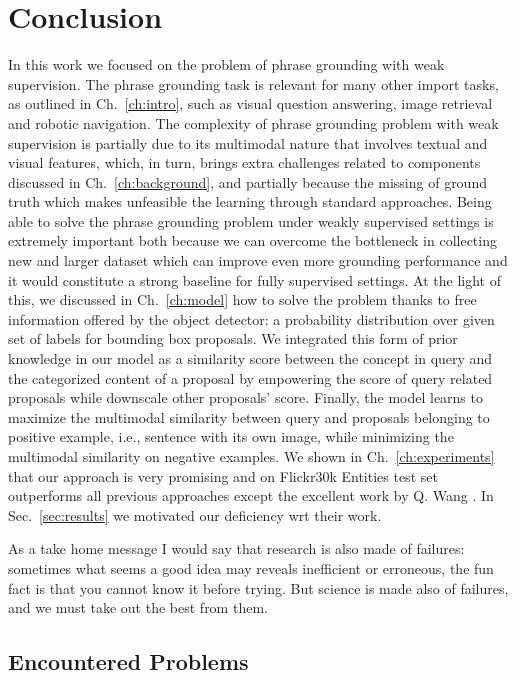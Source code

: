 \chapter{Conclusion}
\label{ch:conclusion}

In this work we focused on the problem of phrase grounding with weak
supervision. The phrase grounding task is relevant for many other
import tasks, as outlined in Ch.~\ref{ch:intro}, such as visual
question answering, image retrieval and robotic navigation. The
complexity of phrase grounding problem with weak supervision is
partially due to its multimodal nature that involves textual and
visual features, which, in turn, brings extra challenges related to
components discussed in Ch.~\ref{ch:background}, and partially because
the missing of ground truth which makes unfeasible the learning
through standard approaches. Being able to solve the phrase grounding
problem under weakly supervised settings is extremely important both
because we can overcome the bottleneck in collecting new and larger
dataset which can improve even more grounding performance and it would
constitute a strong baseline for fully supervised settings. At the
light of this, we discussed in Ch.~\ref{ch:model} how to solve the
problem thanks to free information offered by the object detector: a
probability distribution over given set of labels for bounding box
proposals. We integrated this form of prior knowledge in our model as
a similarity score between the concept in query and the categorized
content of a proposal by empowering the score of query related
proposals while downscale other proposals' score. Finally, the model
learns to maximize the multimodal similarity between query and
proposals belonging to positive example, i.e., sentence with its own
image, while minimizing the multimodal similarity on negative
examples. We shown in Ch.~\ref{ch:experiments} that our approach is
very promising and on Flickr30k Entities test set outperforms all
previous approaches except the excellent work by Q. Wang \etal{}
\cite{wang2020maf}. In Sec.~\ref{sec:results} we motivated our
deficiency wrt their work.

As a take home message I would say that research is also made of
failures: sometimes what seems a good idea may reveals inefficient or
erroneous, the fun fact is that you cannot know it before trying. But
science is made also of failures, and we must take out the best from
them.

\section{Encountered Problems}

